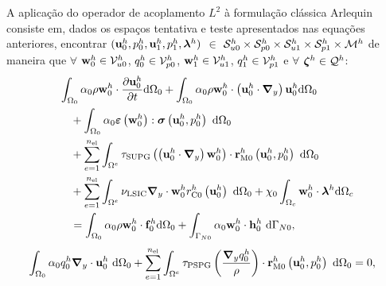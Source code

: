 A aplicação do operador de acoplamento $L^{2}$ à formulação clássica Arlequin consiste em, dados os espaços tentativa e teste apresentados nas equações anteriores, encontrar $(\mathbf{u}_0^h,p_0^h,\mathbf{u}_1^h,p_1^h,\boldsymbol{\lambda}^h)$ $\in$ $\mathcal{S}_{u0}^h \times \mathcal{S}_{p0}^h \times \mathcal{S}_{u1}^h \times \mathcal{S}_{p1}^h \times \mathcal{M}^h$ de maneira que  $\forall$ $\mathbf{w}_0^h \in \mathcal{V}_{u0}^h$, $q_0^h \in \mathcal{V}_{p0}^h$, $\mathbf{w}_1^h \in \mathcal{V}_{u1}^h$, $q_1^h \in \mathcal{V}_{p1}^h$ e $\forall$ $\boldsymbol{\zeta}^h \in \mathcal{Q}^h$:
\begin{align}
	\begin{split}
		&\int_{\globalModel} \arlequinWFGlobal \density \wglobalh \cdot \frac{\partial\uglobalh}{\partial t} \deriv \globalModel +
		\int_{\globalModel} \arlequinWFGlobal \density \wglobalh \cdot  \left(\uglobalh \cdot \gradient \right) \uglobalh \deriv \globalModel  \\ 
		&\quad+	
		\int_{\globalModel} \arlequinWFGlobal \straintensor \left(\wglobalh\right) : \stressTensor \left(\uglobalh,\pglobalh\right)\ \deriv \globalModel \\
		&\quad+ \sum_{e=1}^{\nel} \int_{\domainE} \SUPG  \left(\left(\uglobalh \cdot \gradient \right) \wglobalh\right) \cdot \resMomGlobal\left(\uglobalh,\pglobalh \right)\  \deriv \globalModel \\ 
		&\quad+\sum_{e=1}^{\nel} \int_{\domainE} \LSIC \divergence \cdot \wglobalh \resPreGlobal 
		\left(\uglobalh\right)\  \deriv \globalModel 
		+ \chi_{0} \int_{\gluingZone} \wglobalh \cdot \lagrangeMultiplierh \deriv \gluingZone   \\ 
		&\quad = \int_{\globalModel} \arlequinWFGlobal \density \wglobalh \cdot  \globalsbodyforceh \deriv \globalModel + \int_{\globalBoundaryN} \arlequinWFGlobal \wglobalh  \cdot \globalSurfaceLoadh\ \deriv \globalBoundaryN,
		\label{eq:QM_forma_fraca_0}
	\end{split}
\end{align}
\begin{align}
	\begin{split}
		&	\int_{\Omega_0} \alpha_0 q_0^h \boldsymbol{\nabla}_y \cdot \mathbf{u}_0^h \ \mathrm{d} \Omega_0 +
		\sum_{e=1}^{n_{\mathrm{el}}} \int_{\Omega^e} \tau_{\mathrm{PSPG}} \left(\frac{\boldsymbol{\nabla}_y q_0^h}{\rho}\right) \cdot \mathbf{r}_{\mathrm{M0}}^{h}\left(\mathbf{u}_0^h,p_0^h\right) \  \mathrm{d} \Omega_0 = 0,
		\label{eq:C_forma_fraca_0}
	\end{split}
\end{align}
